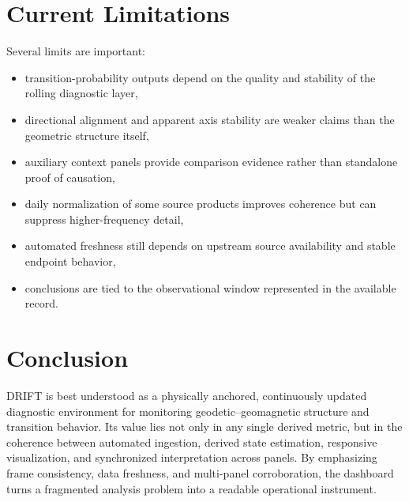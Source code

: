 \documentclass[11pt]{article}
\begin{document}
\section{Current Limitations}
Several limits are important:
\begin{itemize}[leftmargin=1.5em]
  \item transition-probability outputs depend on the quality and stability of the rolling diagnostic layer,
  \item directional alignment and apparent axis stability are weaker claims than the geometric structure itself,
  \item auxiliary context panels provide comparison evidence rather than standalone proof of causation,
  \item daily normalization of some source products improves coherence but can suppress higher-frequency detail,
  \item automated freshness still depends on upstream source availability and stable endpoint behavior,
  \item conclusions are tied to the observational window represented in the available record.
\end{itemize}

\section{Conclusion}
DRIFT is best understood as a physically anchored, continuously updated diagnostic environment for monitoring geodetic--geomagnetic structure and transition behavior. Its value lies not only in any single derived metric, but in the coherence between automated ingestion, derived state estimation, responsive visualization, and synchronized interpretation across panels. By emphasizing frame consistency, data freshness, and multi-panel corroboration, the dashboard turns a fragmented analysis problem into a readable operational instrument.
\end{document}
